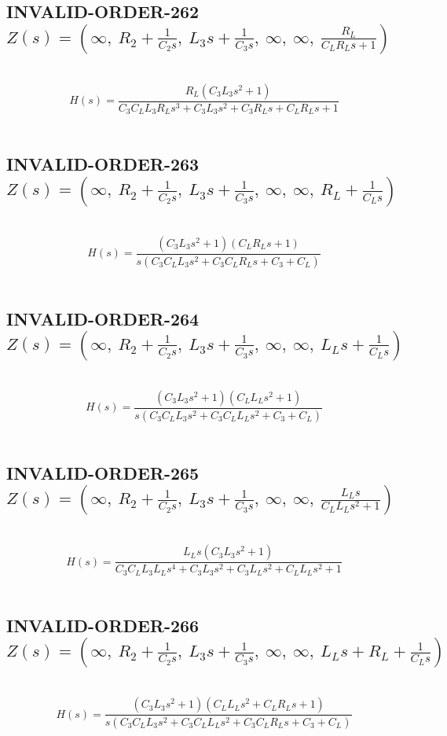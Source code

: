 \documentclass{article}
\begin{document}
\subsection{INVALID-ORDER-262 $Z(s) = \left( \infty, \  R_{2} + \frac{1}{C_{2} s}, \  L_{3} s + \frac{1}{C_{3} s}, \  \infty, \  \infty, \  \frac{R_{L}}{C_{L} R_{L} s + 1}\right)$ } \ 
\textbf{\[H(s) = \frac{R_{L} \left(C_{3} L_{3} s^{2} + 1\right)}{C_{3} C_{L} L_{3} R_{L} s^{3} + C_{3} L_{3} s^{2} + C_{3} R_{L} s + C_{L} R_{L} s + 1}\] } \ 
\subsection{INVALID-ORDER-263 $Z(s) = \left( \infty, \  R_{2} + \frac{1}{C_{2} s}, \  L_{3} s + \frac{1}{C_{3} s}, \  \infty, \  \infty, \  R_{L} + \frac{1}{C_{L} s}\right)$ } \ 
\textbf{\[H(s) = \frac{\left(C_{3} L_{3} s^{2} + 1\right) \left(C_{L} R_{L} s + 1\right)}{s \left(C_{3} C_{L} L_{3} s^{2} + C_{3} C_{L} R_{L} s + C_{3} + C_{L}\right)}\] } \ 
\subsection{INVALID-ORDER-264 $Z(s) = \left( \infty, \  R_{2} + \frac{1}{C_{2} s}, \  L_{3} s + \frac{1}{C_{3} s}, \  \infty, \  \infty, \  L_{L} s + \frac{1}{C_{L} s}\right)$ } \ 
\textbf{\[H(s) = \frac{\left(C_{3} L_{3} s^{2} + 1\right) \left(C_{L} L_{L} s^{2} + 1\right)}{s \left(C_{3} C_{L} L_{3} s^{2} + C_{3} C_{L} L_{L} s^{2} + C_{3} + C_{L}\right)}\] } \ 
\subsection{INVALID-ORDER-265 $Z(s) = \left( \infty, \  R_{2} + \frac{1}{C_{2} s}, \  L_{3} s + \frac{1}{C_{3} s}, \  \infty, \  \infty, \  \frac{L_{L} s}{C_{L} L_{L} s^{2} + 1}\right)$ } \ 
\textbf{\[H(s) = \frac{L_{L} s \left(C_{3} L_{3} s^{2} + 1\right)}{C_{3} C_{L} L_{3} L_{L} s^{4} + C_{3} L_{3} s^{2} + C_{3} L_{L} s^{2} + C_{L} L_{L} s^{2} + 1}\] } \ 
\subsection{INVALID-ORDER-266 $Z(s) = \left( \infty, \  R_{2} + \frac{1}{C_{2} s}, \  L_{3} s + \frac{1}{C_{3} s}, \  \infty, \  \infty, \  L_{L} s + R_{L} + \frac{1}{C_{L} s}\right)$ } \ 
\textbf{\[H(s) = \frac{\left(C_{3} L_{3} s^{2} + 1\right) \left(C_{L} L_{L} s^{2} + C_{L} R_{L} s + 1\right)}{s \left(C_{3} C_{L} L_{3} s^{2} + C_{3} C_{L} L_{L} s^{2} + C_{3} C_{L} R_{L} s + C_{3} + C_{L}\right)}\] } \ 
\end{document}

